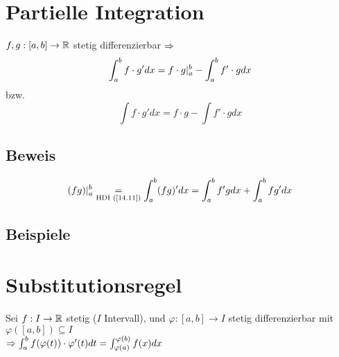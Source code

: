 \section{Partielle Integration}\label{14.13}
$f,g: [a,b] \to \mathbb{R}$ stetig differenzierbar $\Rightarrow$
$$\int_a^b f \cdot g' dx = f \cdot g \arrowvert_a^b - \int_a^b f' \cdot g dx$$
bzw.
$$\int f \cdot g' dx = f \cdot g - \int f' \cdot g dx$$

\subsection*{Beweis}
$$(fg) \arrowvert_a^b \underset{\text{HDI (\ref{14.11})}}{=} \int_a^b (fg)' dx = \int_a^b f' g dx + \int_a^b fg' dx$$

\subsection*{Beispiele}

\section{Substitutionsregel}\label{14.14}
Sei $f: I \to \mathbb{R}$ stetig ($I$ Intervall), und $\varphi: [a,b] \to I$ stetig differenzierbar mit $\varphi([a,b]) \subseteq I$\\
$\Rightarrow \int_a^b f(\varphi(t)) \cdot \varphi'(t) dt = \int_{\varphi(a)}^{\varphi(b)} f(x) dx$